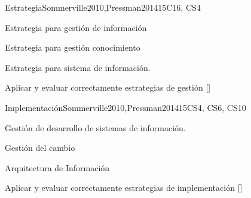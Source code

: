 \begin{syllabus}
\begin{unit}{Estrategia}{}{Sommerville2010,Pressman2014}{15}{C16, CS4}
\begin{topics}
    \item Estrategia para gestión de información
    \item Estrategia para gestión conocimiento
    \item Estrategia para sistema de información.
\end{topics}
\begin{learningoutcomes}
    \item Aplicar y evaluar correctamente estrategias de gestión [\Assessment]
\end{learningoutcomes}
\end{unit}

\begin{unit}{Implementación}{}{Sommerville2010,Pressman2014}{15}{CS4, CS6, CS10}
\begin{topics}
    \item Gestión de desarrollo de sistemas de información.
    \item Gestión del cambio
    \item Arquitectura de Información
\end{topics}
\begin{learningoutcomes}
    \item Aplicar y evaluar correctamente estrategias de implementación [\Assessment]
\end{learningoutcomes}
\end{unit}

\begin{coursebibliography}
\end{coursebibliography}

\end{syllabus}
